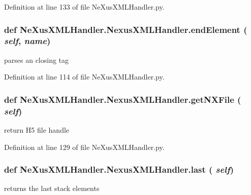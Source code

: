 Definition at line 133 of file NeXusXMLHandler.py.\hypertarget{classNeXusXMLHandler_1_1NexusXMLHandler_a7eaf181e6f44254524d5af581f7bca04}{
\subsubsection[{endElement}]{\setlength{\rightskip}{0pt plus 5cm}def NeXusXMLHandler.NexusXMLHandler.endElement ( {\em self}, \/   {\em name})}}
\label{classNeXusXMLHandler_1_1NexusXMLHandler_a7eaf181e6f44254524d5af581f7bca04}
\begin{DoxyVerb}parses an closing tag\end{DoxyVerb}
 

Definition at line 114 of file NeXusXMLHandler.py.\hypertarget{classNeXusXMLHandler_1_1NexusXMLHandler_aae79ec1d3f132674e5461f65ac2ac544}{
\subsubsection[{getNXFile}]{\setlength{\rightskip}{0pt plus 5cm}def NeXusXMLHandler.NexusXMLHandler.getNXFile ( {\em self})}}
\label{classNeXusXMLHandler_1_1NexusXMLHandler_aae79ec1d3f132674e5461f65ac2ac544}
\begin{DoxyVerb}return H5 file handle \end{DoxyVerb}
 

Definition at line 129 of file NeXusXMLHandler.py.\hypertarget{classNeXusXMLHandler_1_1NexusXMLHandler_a687710f09884c337240c215e38954abb}{
\subsubsection[{last}]{\setlength{\rightskip}{0pt plus 5cm}def NeXusXMLHandler.NexusXMLHandler.last ( {\em self})}}
\label{classNeXusXMLHandler_1_1NexusXMLHandler_a687710f09884c337240c215e38954abb}
\begin{DoxyVerb}returns the last stack elements \end{DoxyVerb}
 


